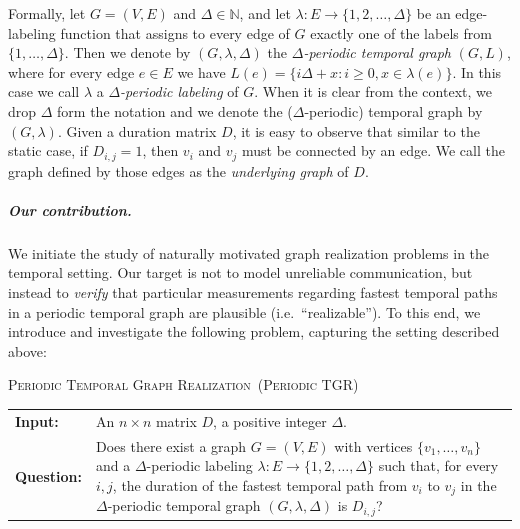 \documentclass[a4paper,UKenglish,cleveref, autoref, thm-restate, anonymous]{lipics-v2021}
\makeatletter
\newcommand{\problemdef}[3]{
	\begin{center}
		\begin{minipage}{0.95\textwidth}
			\noindent
			#1
			\vspace{5pt}\\
			\setlength{\tabcolsep}{3pt}
			\begin{tabularx}{\textwidth}{@{}lX@{}}
				\textbf{Input:}& #2 \\
				\textbf{Question:}& #3
			\end{tabularx}
		\end{minipage}
	\end{center}
}
\newcommand{\deltaExactLong}{\textsc{Periodic Temporal Graph Realization}}
\newcommand{\deltaExact}{\textsc{Periodic TGR}}
\makeatother
\begin{document}





Formally, let $G=(V,E)$ and $\Delta\in \mathbb{N}$, and let $\lambda: E \rightarrow \{1,2,\ldots,\Delta\}$ be an edge-labeling function that assigns to every edge of $G$ exactly one of the labels from $\{1,\ldots,\Delta\}$. 
Then we denote by $(G,\lambda,\Delta)$ the \emph{$\Delta$-periodic temporal graph} $(G,L)$, where for every edge $e\in E$ we have $L(e)=\{i\Delta + x : i\geq 0, x\in \lambda(e)\}$. 
In this case we call $\lambda$ a \emph{$\Delta$-periodic labeling} of $G$. 
When it is clear from the context, we drop $\Delta$ form the notation and 
we denote the ($\Delta$-periodic) temporal graph by $(G,\lambda)$.
Given a duration matrix $D$, it is easy to observe that similar to the static case, if $D_{i,j}=1$, then $v_i$ and $v_j$ must be connected by an edge. We call the graph defined by those edges as the \emph{underlying graph} of $D$.





\subparagraph{Our contribution.}
We initiate the study of naturally motivated graph realization problems in the temporal setting. 
Our target is not to model unreliable communication, but instead to \emph{verify} that particular measurements regarding fastest temporal paths in a periodic temporal graph are plausible (i.e.~``realizable''). 
To this end, we introduce and investigate the following problem, capturing the setting described above:
	
	
\problemdef{\deltaExactLong\ (\deltaExact)}
{An $n \times n$ matrix $D$, a positive integer $\Delta$.}
{Does there exist a graph $G=(V,E)$ with vertices $\{v_1,\ldots,v_{n}\}$ 
and a $\Delta$-periodic labeling $\lambda: E \rightarrow \{1,2,\ldots,\Delta\}$ such that, 
for every $i,j$, the duration of the fastest temporal path from $v_i$ to $v_j$ in the $\Delta$-periodic temporal graph $(G,\lambda,\Delta)$ is $D_{i,j}$?}
\end{document}

